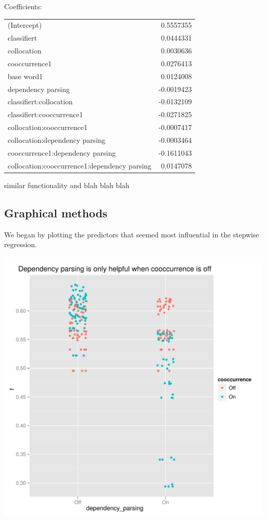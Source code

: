 \documentclass{article}
\begin{document}
Coefficients:

\begin{tabular}{l r}
                                (Intercept) & 0.5557355 \\
                                classifiert & 0.0444331  \\
                                 collocation & 0.0030636  \\
                              cooccurrence1 & 0.0276413 \\
                                 base word1 & 0.0124008  \\
                         dependency parsing & -0.0019423 \\
                     classifiert:collocation & -0.0132109 \\
                  classifiert:cooccurrence1 & -0.0271825 \\
                   collocation:cooccurrence1 & -0.0007417 \\
              collocation:dependency parsing & -0.0003464 \\
           cooccurrence1:dependency parsing & -0.1611043 \\
collocation:cooccurrence1:dependency parsing & 0.0147078  \\
\end{tabular}


similar functionality and blah blah blah

\subsection{Graphical methods}
We began by plotting the predictors that seemed most influential in the
stepwise regression.

\includegraphics[width=\textwidth]{pg_0001}
\end{document}
